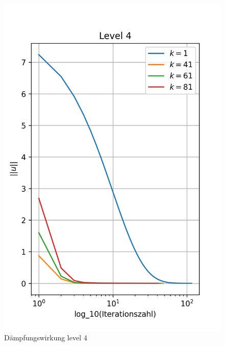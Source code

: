\documentclass[11pt,a4paper]{article}
\begin{document}
\begin{figure}[htbp]
\begin{minipage}{0.45\linewidth}
        \includegraphics[width=\linewidth,scale=0.7]{h1_level4}
        \caption[Level 4]{Dämpfungswirkung level 4}\label{fig:h1_level4}
    \end{minipage}
\end{figure}
\end{document}
